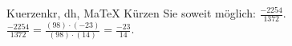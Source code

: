 \begin{MAufgabe}{Kuerzen}{kr, dh, MaTeX}
K\"urzen Sie soweit m\"oglich: $\frac{-2254}{1372}$.\\ 
\ifLsg\MLoesung
\quad $\frac{-2254}{1372}=\frac{(98)\cdot(-23)}{(98)\cdot(14)}=\frac{-23}{14}$.\else\relax\fi
 \end{MAufgabe}